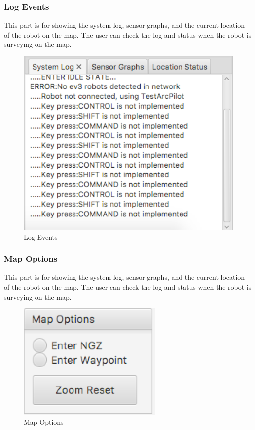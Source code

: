\documentclass[10pt,a4paper,titlepage]{article}
\begin{document}
   
  \subsubsection{Log Events} 
This part is for showing the system log, sensor graphs, and the current location of the robot on the map. The user can check the log and status when the robot is surveying on the map.
  \begin{figure}[H] 
  \includegraphics[width=\linewidth]{log.png}  %
  \caption{Log Events} 
  \label{fig:Log Events}               
  \end{figure} 
   
   
  \subsubsection{  Map Options} 
This part is for showing the system log, sensor graphs, and the current location of the robot on the map. The user can check the log and status when the robot is surveying on the map.
  \begin{figure}[H] 
  \includegraphics[width=\linewidth]{options.png}  %
  \caption{Map Options} 
  \label{fig:Map Options}               
  \end{figure} 
   
\end{document}
